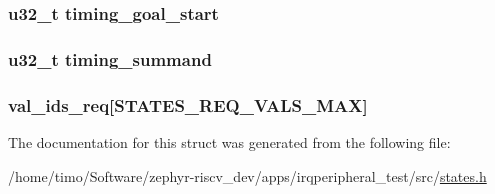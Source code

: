 \subsubsection[{\texorpdfstring{timing\+\_\+goal\+\_\+start}{timing_goal_start}}]{\setlength{\rightskip}{0pt plus 5cm}u32\+\_\+t timing\+\_\+goal\+\_\+start}\hypertarget{struct_state_a460c2961861ad0bfe6b175e2d310fa5a}{}\label{struct_state_a460c2961861ad0bfe6b175e2d310fa5a}
\subsubsection[{\texorpdfstring{timing\+\_\+summand}{timing_summand}}]{\setlength{\rightskip}{0pt plus 5cm}u32\+\_\+t timing\+\_\+summand}\hypertarget{struct_state_ad775f6c08e398dddae5d7fbcd8487b6d}{}\label{struct_state_ad775f6c08e398dddae5d7fbcd8487b6d}
\subsubsection[{\texorpdfstring{val\+\_\+ids\+\_\+req}{val_ids_req}}]{ val\+\_\+ids\+\_\+req\mbox{[}{\bf S\+T\+A\+T\+E\+S\+\_\+\+R\+E\+Q\+\_\+\+V\+A\+L\+S\+\_\+\+M\+AX}\mbox{]}}\hypertarget{struct_state_ab6d93aa56200181dd2b06e3eda4bc090}{}\label{struct_state_ab6d93aa56200181dd2b06e3eda4bc090}


The documentation for this struct was generated from the following file\+:\begin{DoxyCompactItemize}
\item 
/home/timo/\+Software/zephyr-\/riscv\+\_\+dev/apps/irqperipheral\+\_\+test/src/\hyperlink{states_8h}{states.\+h}\end{DoxyCompactItemize}
